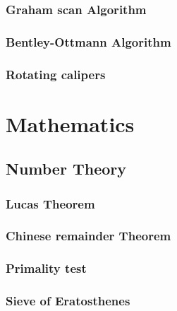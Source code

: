 \documentclass[10pt,landscape,twocolumn]{article}
\begin{document}
\subsubsection{Graham scan Algorithm}
\subsubsection{Bentley-Ottmann Algorithm}
\subsubsection{Rotating calipers}

\section{Mathematics}

\subsection{Number Theory}
\subsubsection{Lucas Theorem}
\subsubsection{Chinese remainder Theorem}
\subsubsection{Primality test}
\subsubsection{Sieve of Eratosthenes}

\end{document}
